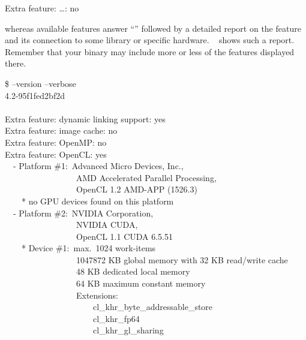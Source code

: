 \begin{literal}
  Extra feature: \dots: no
\end{literal}

whereas available features answer ``'' followed by a detailed report on the feature
and its connection to some library or specific hardware.
\exampleName~ shows such a report.  Remember that your binary
may include more or less of the features displayed there.

\begin{exemplar}
  \begin{maxipage}
    \begin{terminal}
      \$ \app{} --version --verbose \\
        \app{} 4.2-95f1fed2bf2d \\
        ~ \\
        Extra feature: dynamic linking support: yes \\
        Extra feature: image cache: no \\
        Extra feature: OpenMP: no \\
        Extra feature: OpenCL: yes \\
        ~~- Platform \#1:~Advanced Micro Devices, Inc., \\
        ~~~~~~~~~~~~~~~~~AMD Accelerated Parallel Processing, \\
        ~~~~~~~~~~~~~~~~~OpenCL 1.2 AMD-APP (1526.3) \\
        ~~~~* no GPU devices found on this platform \\
        ~~- Platform \#2:~NVIDIA Corporation, \\
        ~~~~~~~~~~~~~~~~~NVIDIA CUDA, \\
        ~~~~~~~~~~~~~~~~~OpenCL 1.1 CUDA 6.5.51 \\
        ~~~~* Device \#1:~max.~1024 work-items \\
        ~~~~~~~~~~~~~~~~~1047872 KB global memory with 32 KB read/write cache \\
        ~~~~~~~~~~~~~~~~~48 KB dedicated local memory \\
        ~~~~~~~~~~~~~~~~~64 KB maximum constant memory \\
        ~~~~~~~~~~~~~~~~~Extensions: \\
        ~~~~~~~~~~~~~~~~~~~~~cl\_khr\_byte\_addressable\_store \\
        ~~~~~~~~~~~~~~~~~~~~~cl\_khr\_fp64 \\
        ~~~~~~~~~~~~~~~~~~~~~cl\_khr\_gl\_sharing \\

\end{terminal}
\end{maxipage}
\end{exemplar}
